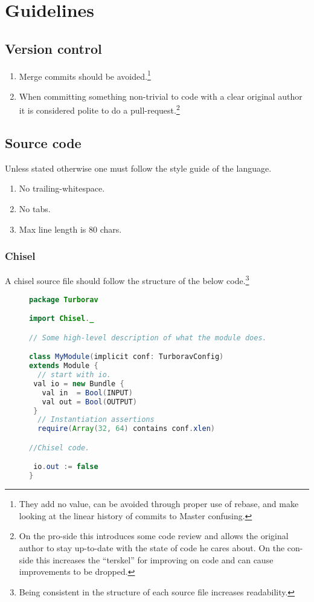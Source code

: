 \documentclass[12pt]{article}
\begin{document}
\section{Guidelines}
\subsection{Version control}
\begin{enumerate}
\item Merge commits should be avoided.\footnote
  {
    They add no value, can be avoided through proper use of rebase, and
    make looking at the linear history of commits to Master confusing.
  }
  \item When committing something non-trivial to code with a clear
    original author it is considered polite to do a pull-request.\footnote
    {
      On the pro-side this introduces some code review and allows the
      original author to stay up-to-date with the state of code he cares
      about. On the con-side this increases the ``terskel'' for improving on
      code and can cause improvements to be dropped.
    }
\end{enumerate}
\subsection{Source code}
Unless stated otherwise one must follow the style guide of the
language.
\begin{enumerate}
  \item No trailing-whitespace.
  \item No tabs.
  \item Max line length is 80 chars.
\end{enumerate}
\subsubsection{Chisel}

A chisel source file should follow the structure of the below code.\footnote
{
  Being consistent in the structure of each source file increases readability.
}
\begin{figure}
\begin{lstlisting}[language=Java, frame=single]
package Turborav

import Chisel._

// Some high-level description of what the module does.

class MyModule(implicit conf: TurboravConfig)
extends Module {
  // start with io.
 val io = new Bundle {
   val in  = Bool(INPUT)
   val out = Bool(OUTPUT)
 }
  // Instantiation assertions
  require(Array(32, 64) contains conf.xlen)

//Chisel code.

 io.out := false
}
\end{lstlisting}
\end{figure}
\end{document}
